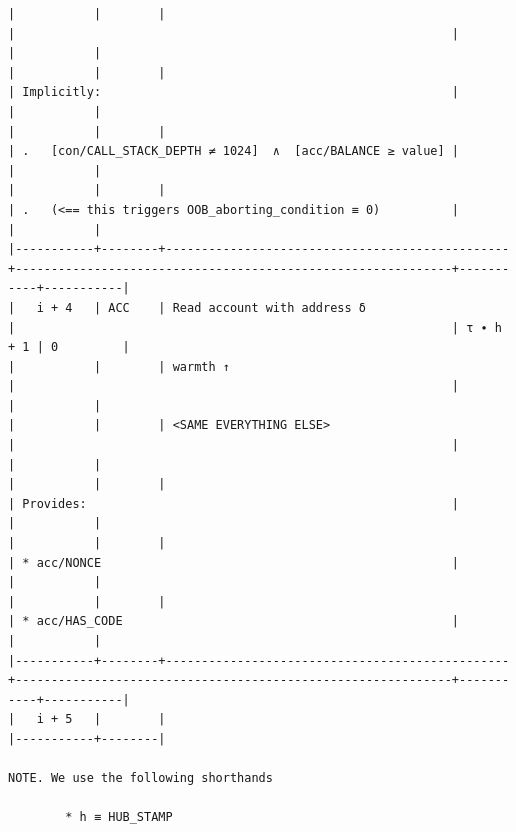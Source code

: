 \documentclass[varwidth=\maxdimen,margin=0.5cm,multi={verbatim}]{standalone}
\begin{document}
\begin{verbatim}
|           |        |                                                |                                                             |           |           |
|           |        |                                                | Implicitly:                                                 |           |           |
|           |        |                                                | .   [con/CALL_STACK_DEPTH ≠ 1024]  ∧  [acc/BALANCE ≥ value] |           |           |
|           |        |                                                | .   (<== this triggers OOB_aborting_condition ≡ 0)          |           |           |
|-----------+--------+------------------------------------------------+-------------------------------------------------------------+-----------+-----------|
|   i + 4   | ACC    | Read account with address δ                    |                                                             | τ ∙ h + 1 | 0         |
|           |        | warmth ↑                                       |                                                             |           |           |
|           |        | <SAME EVERYTHING ELSE>                         |                                                             |           |           |
|           |        |                                                | Provides:                                                   |           |           |
|           |        |                                                | * acc/NONCE                                                 |           |           |
|           |        |                                                | * acc/HAS_CODE                                              |           |           |
|-----------+--------+------------------------------------------------+-------------------------------------------------------------+-----------+-----------|
|   i + 5   |        |
|-----------+--------|

NOTE. We use the following shorthands

        * h ≡ HUB_STAMP

\end{verbatim}
\end{document}
